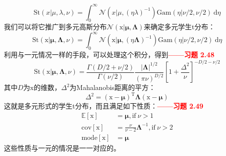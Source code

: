 \documentclass[b5paper]{book}
\numberwithin{equation}{chapter}
\newcommand {\bx} {\boldsymbol{\mathrm{x}}}
\newcommand {\rmT} {\mathrm{T}}
\newcommand {\bfMu} {\boldsymbol{\mu}}
\newcommand {\bfLambda} {\boldsymbol{\Lambda}}
\begin{document}
{\begin{equation}
		\mathrm{St}(x|\mu,\lambda,\nu)=\int_0^{\infty}\mathcal{N}(x|\mu,(\eta\lambda)^{-1})\mathrm{Gam}(\eta|\nu/2,\nu/2)\ \mathrm{d}\eta
	\end{equation}
	我们可以将它推广到多元高斯分布$\mathcal{N}(\bx|\bfMu,\bfLambda)$来确定多元学生t分布：
	\begin{equation}
		\mathrm{St}(\bx|\bfMu, \bfLambda, \nu) = \int_0^{\infty} \mathcal{N}(\bx|\bfMu,(\eta\bfLambda)^{-1})\mathrm{Gam}(\eta|\nu/2,\nu/2)\ \mathrm{d}\eta
	\end{equation}
	利用与一元情况一样的手段，可以处理这个积分，得到\textcolor{red}{\textbf{——习题 2.48}}
	\begin{equation}
		\mathrm{St}(\bx|\bfMu, \bfLambda, \nu)=\frac{\Gamma(D/2+\nu/2)}{\Gamma(\nu/2)}\frac{|\bfLambda|^{1/2}}{(\pi\nu)^{D/2}}\left[1+\frac{\Delta^2}{\nu}\right]^{-D/2-\nu/2}
	\end{equation}
	其中$D$为$\bx$的维数，$\Delta^2$为Mahalanobis距离的平方：
	\begin{equation}
		\Delta^2 = (\bx - \bfMu)^{\rmT}\bfLambda(\bx-\bfMu)
	\end{equation}
	这就是多元形式的学生t分布，而且满足如下性质：\textcolor{red}{\textbf{——习题 2.49}}
	\begin{align}
		\mathbb{E}[\bx]&=\bfMu, \mathrm{if}\ \nu>1 \\
		\mathrm{cov}[\bx] &= \frac{\nu}{\nu-2}\bfLambda^{-1}, \mathrm{if}\ \nu>2 \\
		\mathrm{mode}[\bx]&=\bfMu
	\end{align}
	这些性质与一元的情况是一一对应的。
	}
\end{document}
